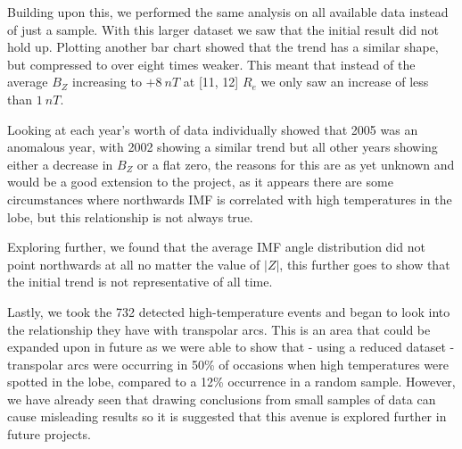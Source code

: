 \documentclass[12pt]{article}
\begin{document}
Building upon this, we performed the same analysis on all available data instead of just a sample. With this larger dataset we saw that the initial result did not hold up. Plotting another bar chart showed that the trend has a similar shape, but compressed to over eight times weaker. This meant that instead of the average $B_Z$ increasing to $+8\ nT$ at [11, 12] $R_e$ we only saw an increase of less than $1\ nT$. 

Looking at each year's worth of data individually showed that 2005 was an anomalous year, with 2002 showing a similar trend but all other years showing either a decrease in $B_Z$ or a flat zero, the reasons for this are as yet unknown and would be a good extension to the project, as it appears there are some circumstances where northwards IMF is correlated with high temperatures in the lobe, but this relationship is not always true. 

Exploring further, we found that the average IMF angle distribution did not point northwards at all no matter the value of $|Z|$, this further goes to show that the initial trend is not representative of all time.

Lastly, we took the 732 detected high-temperature events and began to look into the relationship they have with transpolar arcs. This is an area that could be expanded upon in future as we were able to show that - using a reduced dataset - transpolar arcs were occurring in 50\% of occasions when high temperatures were spotted in the lobe, compared to a 12\% occurrence in a random sample. However, we have already seen that drawing conclusions from small samples of data can cause misleading results so it is suggested that this avenue is explored further in future projects.

\printbibliography
\end{document}
